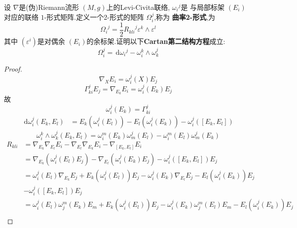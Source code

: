 \documentclass[../../几何与拓扑.tex]{subfiles}
\begin{document}
\begin{problem}
  设 \(   \nabla   \)是(伪)Riemann流形 \(  \left( M,g \right)   \)上的Levi-Civita联络, \(   { \omega _{i}} ^{j}\)是   与局部标架 \(  \left( E_{i} \right)   \)对应的联络 \(  1  \)-形式矩阵.定义一个2-形式的矩阵 \(   \Omega _{i}^{j}  \),称为 \textbf{曲率2-形式},为 \[
  { \Omega _{i}}^{j}= \frac{1 }{2 }{R_{kli}} ^{j}  \varepsilon ^{k}\wedge  \varepsilon ^{l}
  \]   其中 \(  \left(  \varepsilon ^{i} \right)   \)是对偶余 \(  \left( E_{i} \right)   \)的余标架.证明以下\textbf{Cartan第二结构方程}成立: \[
   \Omega _{i}^{j}= \,\mathrm{d} { \omega _{i}}^{j} - \omega _{i}^{k}\wedge  \omega _{k}^{j}
  \]  
\end{problem}
\begin{proof}
  \[
   \nabla _{X}E_{i}=  \omega _{i}^{j}\left( X \right)E_{j} 
  \]  \[
   \Gamma _{ki}^{j}E_{j}=  \nabla _{E_{k}}E_{i}=  \omega _{i}^{j}\left( E_{k} \right)E_{j} 
  \]故 \[
   \omega _{i}^{j}\left( E_{k} \right)=  \Gamma _{ki}^{j} 
  \] \[
 \begin{aligned}
 \,\mathrm{d}  \omega _{i}^{j}\left( E_{k},E_{l} \right)&=  E_{k}\left(  \omega _{i}^{j}\left( E_{l} \right)  \right)-E_{l}\left(  \omega _{i}^{j}\left( E_{k} \right)  \right)- \omega _{i}^{j}\left( \left[ E_{k},E_{l} \right]  \right)   
 \end{aligned}
  \]\[
   \omega _{i}^{k}\wedge  \omega _{k}^{j}\left( E_{k},E_{l} \right)= \omega _{i}^{m}\left( E_{k} \right) \omega _{m}^{j}\left( E_{l} \right)   - \omega _{i}^{m}\left( E_{l} \right)  \omega _{m}^{j}\left( E_{k} \right) 
  \]\[
  \begin{aligned}
  R_{kli}&=  \nabla _{E_{k}}  \nabla _{E_{l}}E_{i}- \nabla _{E_{l}} \nabla _{E_{k}}E_{i}- \nabla _{\left[ E_{k},E_{l} \right] }E_{i}\\ 
   &=  \nabla _{E_{k}}\left(  \omega _{i}^{j}\left( E_{l} \right)E_{j}  \right) - \nabla _{E_{l}}\left(  \omega _{i}^{j}\left( E_{k} \right)E_{j}  \right)-  \omega _{i}^{j}\left( \left[  E_{k},E_{l}\right]  \right)E_{j}  \\ 
    &=  \omega _{i}^{j}\left( E_{l} \right) \nabla _{E_{k}}E_{j} + E_{k}\left(  \omega _{i}^{j}\left( E_{l} \right)  \right)E_{j} -  \omega _{i}^{j}\left( E_{k} \right) \nabla _{E_{l}} E_{j}- E_{l}\left(  \omega _{i}^{j}\left( E_{k} \right)  \right)E_{j}\\ 
     &- \omega _{i}^{j}\left( \left[ E_{k},E_{l} \right]  \right)E_{j}  \\ 
      &=  \omega _{i}^{j}\left( E_{l} \right) \omega _{j}^{m}\left( E_{k} \right)E_{m} + E_{k}  \left(  \omega _{i}^{j}\left( E_{l} \right)  \right)E_{j}-  \omega _{i}^{j}\left( E_{k} \right) \omega _{j}^{m}\left( E_{l} \right)E_{m}-E_{l}\left(  \omega _{i}^{j}\left( E_{k} \right)  \right)E_{j}\\ 

\end{aligned}\]
\end{proof}
\end{document}
